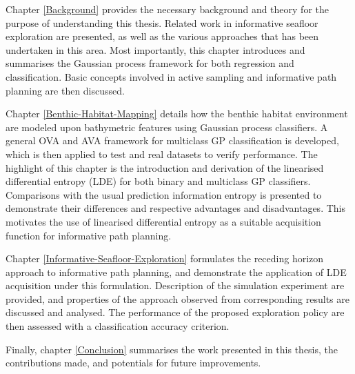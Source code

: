 		Chapter \ref{Background} provides the necessary background and theory for the purpose of understanding this thesis. Related work in informative seafloor exploration are presented, as well as the various approaches that has been undertaken in this area. Most importantly, this chapter introduces and summarises the Gaussian process framework for both regression and classification. Basic concepts involved in active sampling and informative path planning are then discussed. 
		
		Chapter \ref{Benthic-Habitat-Mapping} details how the benthic habitat environment are modeled upon bathymetric features using Gaussian process classifiers. A general OVA and AVA framework for multiclass GP classification is developed, which is then applied to test and real datasets to verify performance. The highlight of this chapter is the introduction and derivation of the linearised differential entropy (LDE) for both binary and multiclass GP classifiers. Comparisons with the usual prediction information entropy is presented to demonstrate their differences and respective advantages and disadvantages. This motivates the use of linearised differential entropy as a suitable acquisition function for informative path planning.
		
		Chapter \ref{Informative-Seafloor-Exploration} formulates the receding horizon approach to informative path planning, and demonstrate the application of LDE acquisition under this formulation. Description of the simulation experiment are provided, and properties of the approach observed from corresponding results are discussed and analysed. The performance of the proposed exploration policy are then assessed with a classification accuracy criterion.
		
		Finally, chapter \ref{Conclusion} summarises the work presented in this thesis, the contributions made, and potentials for future improvements.
		
